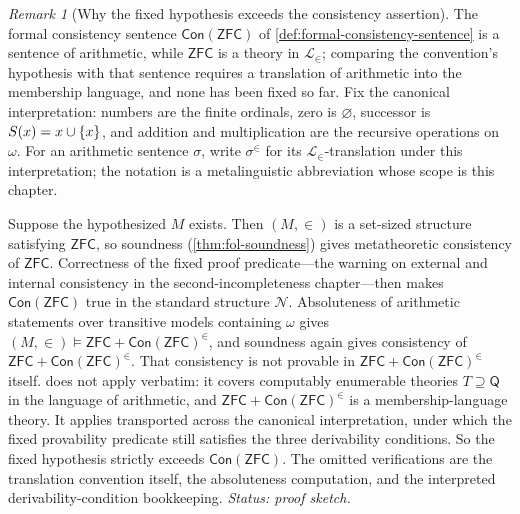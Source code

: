 \documentclass[11pt,oneside,openany]{book}
\theoremstyle{definition}
\theoremstyle{plain}
\theoremstyle{remark}
\newtheorem{remark}[definition]{Remark}
\DeclarePairedDelimiter{\set}{\lbrace}{\rbrace}
\newcommand{\Lang}{\mathcal{L}}
\newcommand{\entails}{\models}
\newcommand{\ZFC}{\mathsf{ZFC}}
\begin{document}
\begin{remark}[Why the fixed hypothesis exceeds the consistency assertion]
The formal consistency sentence \(\mathsf{Con}(\ZFC)\) of
\cref{def:formal-consistency-sentence} is a sentence of arithmetic, while
\(\ZFC\) is a theory in \(\Lang_{\in}\); comparing the convention's
hypothesis with that sentence requires a translation of arithmetic into the
membership language, and none has been fixed so far.  Fix the canonical
interpretation: numbers are the finite ordinals, zero is \(\varnothing\),
successor is \(S(x)=x\cup\set{x}\), and addition and multiplication are the
recursive operations on \(\omega\).  For an arithmetic sentence \(\sigma\),
write \(\sigma^{\in}\) for its \(\Lang_{\in}\)-translation under this
interpretation; the notation is a metalinguistic abbreviation whose scope is
this chapter.

Suppose the hypothesized \(M\) exists.  Then \((M,\in)\) is a set-sized
structure satisfying \(\ZFC\), so soundness (\cref{thm:fol-soundness})
gives metatheoretic consistency of \(\ZFC\).  Correctness of the fixed
proof predicate---the warning on external and internal consistency in the
second-incompleteness chapter---then makes \(\mathsf{Con}(\ZFC)\) true in
the standard structure \(\mathcal N\).  Absoluteness of arithmetic
statements over transitive models containing \(\omega\)
\cite[Chapter~12, pp.~155--174]{Jech2003} gives
\((M,\in)\entails\ZFC+\mathsf{Con}(\ZFC)^{\in}\), and soundness again gives
consistency of \(\ZFC+\mathsf{Con}(\ZFC)^{\in}\).  That consistency is not
provable in \(\ZFC+\mathsf{Con}(\ZFC)^{\in}\) itself.
 does not apply verbatim: it covers computably
enumerable theories \(T\supseteq\mathsf Q\) in the language of arithmetic,
and \(\ZFC+\mathsf{Con}(\ZFC)^{\in}\) is a membership-language theory.  It
applies transported across the canonical interpretation, under which the
fixed provability predicate still satisfies the three derivability
conditions.  So the fixed hypothesis strictly exceeds
\(\mathsf{Con}(\ZFC)\).  The omitted verifications are the translation
convention itself, the absoluteness computation, and the interpreted
derivability-condition bookkeeping.
\textit{Status: proof sketch.}
\end{remark}
\end{document}
